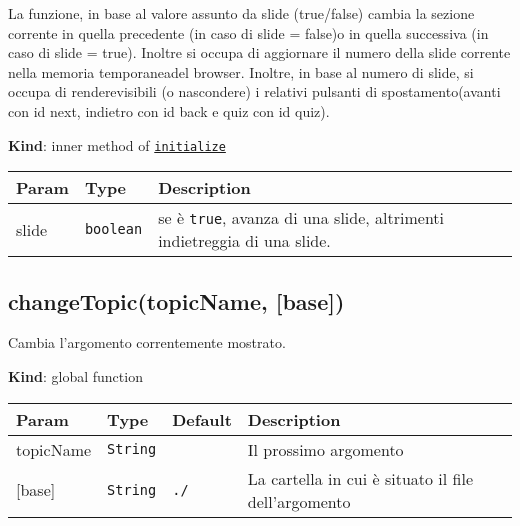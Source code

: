 La funzione, in base al valore assunto da slide (true/false) cambia la
sezione corrente in quella precedente (in caso di slide = false)o in
quella successiva (in caso di slide = true). Inoltre si occupa di
aggiornare il numero della slide corrente nella memoria temporaneadel
browser. Inoltre, in base al numero di slide, si occupa di
renderevisibili (o nascondere) i relativi pulsanti di spostamento(avanti
con id next, indietro con id back e quiz con id quiz).

\textbf{Kind}: inner method of
\protect\hyperlink{initialize}{\texttt{initialize}}

\begin{longtabu} to \textwidth {X[1,L,m]X[1,L,m]X[1.5,L,m]}
\toprule
\begin{minipage}[b]{0.30\columnwidth}\raggedright
Param\strut
\end{minipage} & \begin{minipage}[b]{0.30\columnwidth}\raggedright
Type\strut
\end{minipage} & \begin{minipage}[b]{0.30\columnwidth}\raggedright
Description\strut
\end{minipage}\tabularnewline
\midrule
\endhead
\begin{minipage}[t]{0.30\columnwidth}\raggedright
slide\strut
\end{minipage} & \begin{minipage}[t]{0.30\columnwidth}\raggedright
\texttt{boolean}\strut
\end{minipage} & \begin{minipage}[t]{0.30\columnwidth}\raggedright
se è \texttt{true}, avanza di una slide, altrimenti indietreggia di una
slide.\strut
\end{minipage}\tabularnewline
\bottomrule
\end{longtabu}

\protect\hypertarget{changeTopic}{}{}

\hypertarget{changetopictopicname-base}{%
\subsection{changeTopic(topicName,
{[}base{]})}\label{changetopictopicname-base}}

Cambia l'argomento correntemente mostrato.

\textbf{Kind}: global function

\begin{longtabu} to \textwidth {X[1,L,m]X[1,L,m]X[1.5,L,m]X[1.5,L,m]}
\toprule
Param & Type & Default & Description\tabularnewline
\midrule
\endhead
topicName & \texttt{String} & & Il prossimo argomento\tabularnewline
{[}base{]} & \texttt{String} & \texttt{./} & La cartella in cui è
situato il file dell'argomento\tabularnewline
\bottomrule
\end{longtabu}

